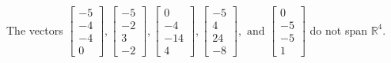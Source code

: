\begin{exercise}
\begin{exerciseStatement}
  \end{exerciseStatement}
  \begin{exerciseAnswer}
   The vectors \(\left[\begin{array}{r}
-5 \\
-4 \\
-4 \\
0
\end{array}\right] , \left[\begin{array}{r}
-5 \\
-2 \\
3 \\
-2
\end{array}\right] , \left[\begin{array}{r}
0 \\
-4 \\
-14 \\
4
\end{array}\right] , \left[\begin{array}{r}
-5 \\
4 \\
24 \\
-8
\end{array}\right] , \text{ and } \left[\begin{array}{r}
0 \\
-5 \\
-5 \\
1
\end{array}\right]\) 
  	 do not  
	span \(\mathbb{R}^4\).
  


  \end{exerciseAnswer}
\end{exercise}
